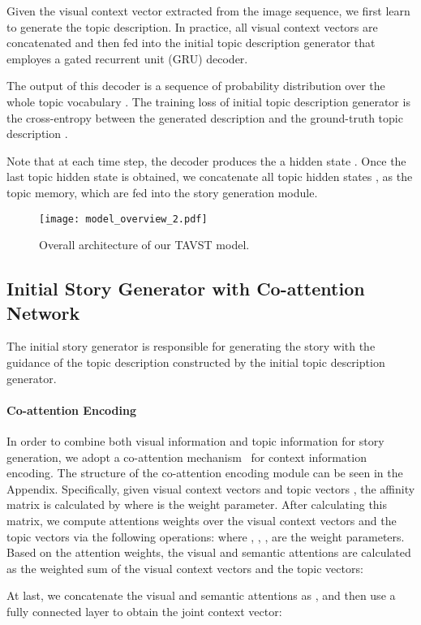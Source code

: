 \documentclass[11pt]{article}
\newcommand{\citep}{\cite}
\begin{document}
Given the visual context vector extracted from the image sequence, we first learn to generate the topic description. In practice, all visual context vectors  are concatenated and then fed into the initial topic description generator that employes a gated recurrent unit (GRU) decoder. 

The output  of this decoder is a sequence of probability distribution over the whole topic vocabulary . The training loss of initial topic description generator is the cross-entropy  between the generated description  and the ground-truth topic description .

Note that at each time step, the decoder produces the a hidden state . Once the last topic hidden state  is obtained, we concatenate all topic hidden states ,  as the topic memory, which are fed into the story generation module. 



\begin{figure*} [!t]
\centering
  \texttt{[image: model\_overview\_2.pdf]}
  \caption{Overall architecture of our TAVST model. }
  \label{fig:over-view}
\end{figure*}

\subsection{Initial Story Generator with Co-attention Network}
\label{initial_story_generator}

The initial story generator is responsible for generating the story with the guidance of the topic description constructed by the initial topic description generator.

\paragraph{Co-attention Encoding}
In order to combine both visual information and topic information for story generation, we adopt a co-attention mechanism~\citep{Jing2018OnTA} for context information encoding. The structure of the co-attention encoding module can be seen in the Appendix. 
Specifically, given visual context vectors  and topic vectors , the affinity matrix  is calculated by
{
}where  is the weight parameter. After calculating this matrix, we compute attentions weights over the visual context vectors and the topic vectors via the following operations:
{
}where , , ,  are the weight parameters. Based on the attention weights, the visual and semantic attentions are calculated as the weighted sum of the visual context vectors and the topic vectors:
{

}
At last, we concatenate the visual and semantic attentions as , and then use a fully connected layer  to obtain the joint context vector:
{


}
\end{document}
